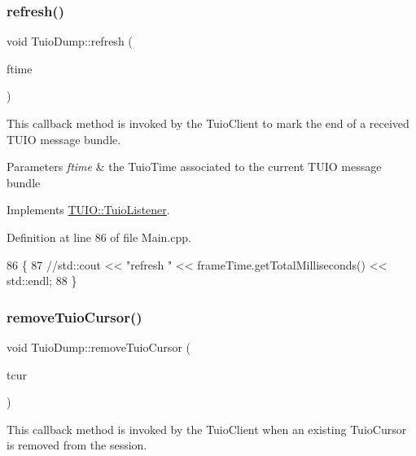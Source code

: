 \subsubsection{\texorpdfstring{refresh()}{refresh()}}
{\footnotesize\ttfamily void Tuio\+Dump\+::refresh (\begin{DoxyParamCaption}\item[{\hyperlink{class_t_u_i_o_1_1_tuio_time}{Tuio\+Time}}]{ftime }\end{DoxyParamCaption})\hspace{0.3cm}{\ttfamily [virtual]}}

This callback method is invoked by the Tuio\+Client to mark the end of a received T\+U\+IO message bundle.


\begin{DoxyParams}{Parameters}
{\em ftime} & the Tuio\+Time associated to the current T\+U\+IO message bundle \\
\hline
\end{DoxyParams}


Implements \hyperlink{class_t_u_i_o_1_1_tuio_listener_a14d16f24c27bb22fe2e24419e447dd63}{T\+U\+I\+O\+::\+Tuio\+Listener}.



Definition at line 86 of file Main.\+cpp.


\begin{DoxyCode}
86                                           \{
87     \textcolor{comment}{//std::cout << "refresh " << frameTime.getTotalMilliseconds() << std::endl;}
88 \}
\end{DoxyCode}
\mbox{\label{class_tuio_dump_a29bea77556080ef3a2efea2d20b17b54}} 
\subsubsection{\texorpdfstring{remove\+Tuio\+Cursor()}{removeTuioCursor()}}
{\footnotesize\ttfamily void Tuio\+Dump\+::remove\+Tuio\+Cursor (\begin{DoxyParamCaption}\item[{\hyperlink{class_t_u_i_o_1_1_tuio_cursor}{Tuio\+Cursor} $\ast$}]{tcur }\end{DoxyParamCaption})\hspace{0.3cm}{\ttfamily [virtual]}}

This callback method is invoked by the Tuio\+Client when an existing Tuio\+Cursor is removed from the session.


